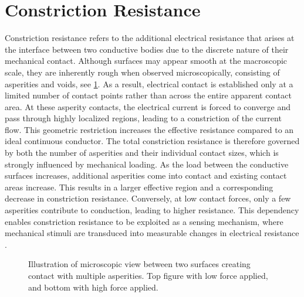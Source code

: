 
\pagebreak
\section{Constriction Resistance}
Constriction resistance refers to the additional electrical resistance that arises at the interface between two conductive bodies due to the discrete nature of their mechanical contact. Although surfaces may appear smooth at the macroscopic scale, they are inherently rough when observed microscopically, consisting of asperities and voids, see \cref{fig:CR}. As a result, electrical contact is established only at a limited number of contact points rather than across the entire apparent contact area.
At these asperity contacts, the electrical current is forced to converge and pass through highly localized regions, leading to a constriction of the current flow. This geometric restriction increases the effective resistance compared to an ideal continuous conductor. The total constriction resistance is therefore governed by both the number of asperities and their individual contact sizes, which is strongly influenced by mechanical loading. 
As the load between the conductive surfaces increases, additional asperities come into contact and existing contact areas increase. This results in a larger effective region and a corresponding decrease in constriction resistance. Conversely, at low contact forces, only a few asperities contribute to conduction, leading to higher resistance.
This dependency enables constriction resistance to be exploited as a sensing mechanism, where mechanical stimuli are transduced into measurable changes in electrical resistance \cite{G.O.A.T}.

\begin{figure}[H]
\centering

    \caption{Illustration of microscopic view between two surfaces creating contact with multiple asperities. Top figure with low force applied, and bottom with high force applied.}
    \label{fig:CR}
\end{figure}